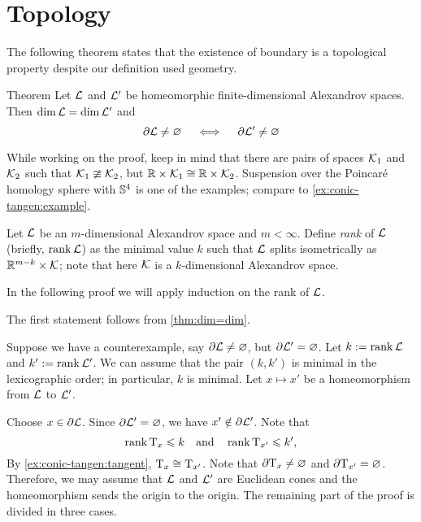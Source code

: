 \section{Topology}

The following theorem states that the existence of boundary is a topological property
despite our definition used geometry.

\begin{thm}{Theorem}\label{thm:top-bry}
Let $\mathcal{L}$ and $\mathcal{L}'$ be homeomorphic finite-dimensional Alexandrov spaces.
Then $\operatorname{\rm dim}\nolimits \mathcal{L}=\operatorname{\rm dim}\nolimits\mathcal{L}'$ and
\[\partial\mathcal{L}\ne \varnothing
\quad\iff\quad
\partial\mathcal{L}'\ne \varnothing
\]
\end{thm}

While working on the proof, keep in mind that there are pairs of spaces $\mathcal{K}_1$ and $\mathcal{K}_2$ such that $\mathcal{K}_1\ncong \mathcal{K}_2$, but $\mathbb{R}\times \mathcal{K}_1\cong \mathbb{R}\times \mathcal{K}_2$.
Suspension over the Poincaré homology sphere with $\mathbb{S}^4$ is one of the examples; compare to \ref{ex:conic-tangen:example}.

Let $\mathcal{L}$ be an $m$-dimensional Alexandrov space and $m<\infty$.
Define \emph{rank} of $\mathcal{L}$ (briefly, $\operatorname{\rm rank}\nolimits\mathcal{L}$) as the minimal value $k$ such that $\mathcal{L}$ splits isometrically as $\mathbb{R}^{m-k}\times \mathcal{K}$;
note that here $\mathcal{K}$ is a $k$-dimensional Alexandrov space.

In the following proof we will apply induction on the rank of $\mathcal{L}$.


The first statement follows from \ref{thm:dim=dim}.

Suppose we have a counterexample, say $\partial \mathcal{L}\ne \varnothing$, but $\partial \mathcal{L}'=\varnothing$.
Let $k\mathrel{:=}\operatorname{\rm rank}\nolimits \mathcal{L}$ and $k'\mathrel{:=}\operatorname{\rm rank}\nolimits \mathcal{L}'$.
We can assume that the pair $(k,k')$ is minimal in the lexicographic order;
in particular, $k$ is minimal.
Let $x\mapsto x'$ be a homeomorphism from $\mathcal{L}$ to $\mathcal{L}'$.

Choose $x\in \partial \mathcal{L}$.
Since $\partial \mathcal{L}'=\varnothing$, we have $x'\notin \partial \mathcal{L}'$.
Note that 
\[\operatorname{\rm rank}\nolimits \mathrm{T}_x\leqslant k
\quad\text{and}\quad
\operatorname{\rm rank}\nolimits \mathrm{T}_{x'}\leqslant k',
\]
By \ref{ex:conic-tangen:tangent}, $\mathrm{T}_x\cong\mathrm{T}_{x'}$.
Note that $\partial \mathrm{T}_x\ne\varnothing$ and $\partial \mathrm{T}_{x'}=\varnothing$.
Therefore, we may assume that $\mathcal{L}$ and $\mathcal{L}'$ are Euclidean cones
and the homeomorphism sends the origin to the origin.
The remaining part of the proof is divided in three cases.

